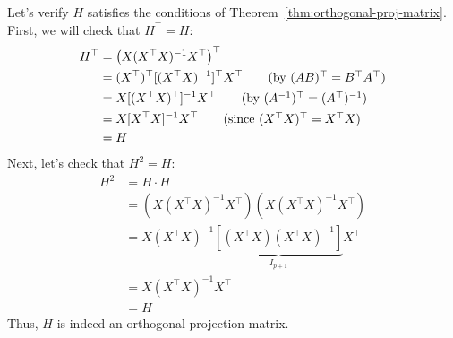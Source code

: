 \documentclass[12pt, a4paper]{article}
\theoremstyle{definition}
\begin{document}
	Let's verify $H$ satisfies the conditions of Theorem~\ref{thm:orthogonal-proj-matrix}.
	First, we will check that $H^\top=H$:
	\begin{align*}
		H^\top&=\left(X(X^\top X)^{-1}X^\top\right)^\top\\
		&=(X^\top)^\top [(X^\top X)^{-1}]^\top X^\top
		\tag{by $(AB)^\top=B^\top A^\top$}\\
		&=X[(X^\top X)^\top]^{-1}X^\top
		\tag{by $(A^{-1})^\top = (A^\top)^{-1}$}\\
		&=X[X^\top X]^{-1}X^\top
		\tag{since $(X^\top X)^\top = X^\top X$}\\
		&=H
	\end{align*}
	Next, let's check that $H^2=H$:
	\begin{align*}
		H^2&=H\cdot H\\
		&=(X(X^\top X)^{-1}X^\top)(X(X^\top X)^{-1}X^\top)\\
		&=X(X^\top X)^{-1}\underbrace{[(X^\top X)(X^\top X)^{-1}]}_{I_{p+1}}X^\top\\
		&=X(X^\top X)^{-1}X^\top\\
		&=H
	\end{align*}
	Thus, $H$ is indeed an orthogonal projection matrix.
\end{document}
